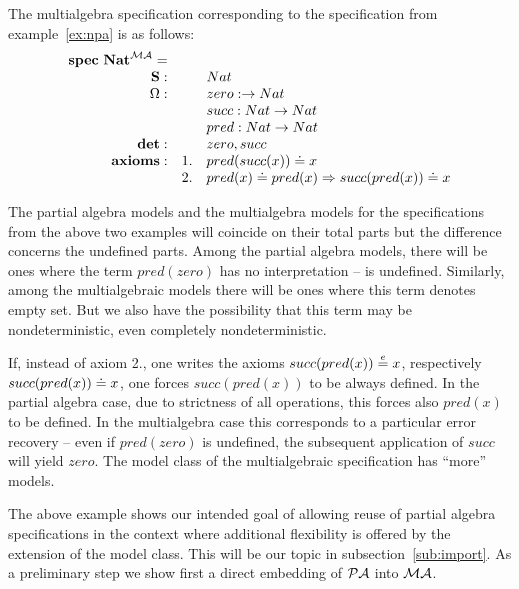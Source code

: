 \documentclass[10pt]{article}
\begin{document}
\begin{example}
The multialgebra specification corresponding to the specification from example~\ref{ex:npa}
is as follows:
\[ \begin{array}{rrl}
{\bf spec\ Nat}^{{\mathcal{MA}}}= \\
	{{\bf S}}: && Nat\\
	{\Omega}:	&& zero:\to Nat\\
		&& succ:Nat \to Nat\\
		&& pred:Nat \to Nat\\
{\bf det}:	&& zero, succ \\
{\bf axioms}:	&1.& pred(succ(x))\mathrel{\dot{=} } x \\
		&2.& pred(x)\mathrel{\dot{=} } pred(x) \Rightarrow succ(pred(x))\mathrel{\dot{=} } x\\
\end{array} \]
\end{example}
The partial algebra models and the multialgebra models for the specifications
from the above two examples will coincide on their total parts but the
difference concerns the undefined parts.
Among the partial algebra models, there will be ones where
the term $pred(zero)$ has no interpretation -- is undefined. Similarly, among
the multialgebraic models there will be ones where this term denotes empty set. 
But we also have the possibility that this term
may be nondeterministic, even completely nondeterministic. 

If, instead of axiom 2., one writes the axioms $succ(pred(x)) \stackrel{e}{=} x$, respectively
$succ(pred(x))\mathrel{\dot{=} } x$, one forces $succ(pred(x))$ to be always defined. In
the partial algebra case, due to strictness of all operations, this forces also
$pred(x)$ to be defined. In the multialgebra case this
corresponds to a particular error recovery -- even if $pred(zero)$ is
undefined, the subsequent application of $succ$ will yield $zero$. The model
class of the multialgebraic specification has ``more'' models.

The above example shows our intended goal of allowing reuse of partial
algebra specifications in the context where additional flexibility is offered by the extension
of the model class. This will be our topic in
subsection~\ref{sub:import}. As a preliminary step we show first a direct embedding of
${\mathcal{PA}}$ into ${\mathcal{MA}}$.
\end{document}
